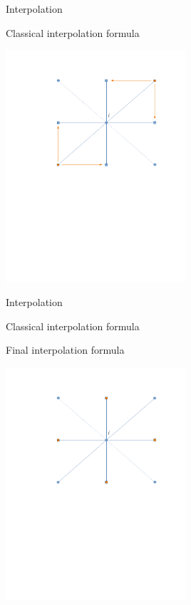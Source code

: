 \documentclass[18pt,xcolor=table]{beamer}
\begin{document}
\begin{frame}{Interpolation}
\begin{block}{Classical interpolation formula}
\end{block}
\begin{center}
\includegraphics[width=0.5\textwidth]{../figures/interpStencilStrongF}
\end{center}
\end{frame}

\begin{frame}{Interpolation}
\begin{block}{Classical interpolation formula}
\bit
\item Final interpolation formula
\eit
\end{block}
\begin{center}
\includegraphics[width=0.5\textwidth]{../figures/interpStencilCpts}
\end{center}
\end{frame}
\end{document}

